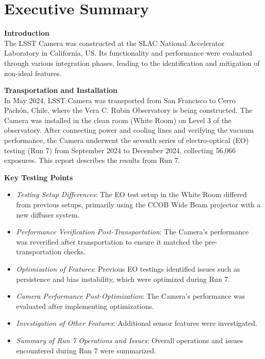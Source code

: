 \section*{Executive Summary}
\textbf{Introduction} \\
The LSST Camera was constructed at the SLAC National Accelerator Laboratory in California, US. Its functionality and performance were evaluated through various integration phases, leading to the identification and mitigation of non-ideal features.

\textbf{Transportation and Installation} \\
In May 2024, LSST Camera was transported from San Francisco to Cerro Pachón, Chile, where the Vera C. Rubin Observatory is being constructed. The Camera was installed in the clean room (White Room) on Level 3 of the observatory. After connecting power and cooling lines and verifying the vacuum performance, the Camera underwent the seventh series of electro-optical (EO) testing (Run 7) from September 2024 to December 2024, collecting 56,066 exposures. This report describes the results from Run 7.

\textbf{Key Testing Points} \\
\begin{itemize}
    \item \textit{Testing Setup Differences}: The EO test setup in the White Room differed from previous setups, primarily using the CCOB Wide Beam projector with a new diffuser system.
    \item \textit{Performance Verification Post-Transportation}: The Camera's performance was reverified after transportation to ensure it matched the pre-transportation checks.
    \item \textit{Optimization of Features}: Previous EO testings identified issues such as persistence and bias instability, which were optimized during Run 7.
    \item \textit{Camera Performance Post-Optimization}: The Camera's performance was evaluated after implementing optimizations.
    \item \textit{Investigation of Other Features}: Additional sensor features were investigated.
    \item \textit{Summary of Run 7 Operations and Issues}: Overall operations and issues encountered during Run 7 were summarized.
\end{itemize}

